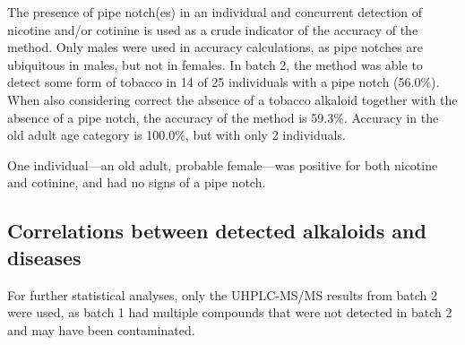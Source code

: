 \documentclass[
  letterpaper,
]{book}
\begin{document}
The presence of pipe notch(es) in an individual and concurrent detection
of nicotine and/or cotinine is used as a crude indicator of the accuracy
of the method. Only males were used in accuracy calculations, as pipe
notches are ubiquitous in males, but not in females. In batch 2, the
method was able to detect some form of tobacco in 14 of 25 individuals
with a pipe notch (56.0\%). When also considering correct the absence of
a tobacco alkaloid together with the absence of a pipe notch, the
accuracy of the method is 59.3\%. Accuracy in the old adult age category
is 100.0\%, but with only 2 individuals.

One individual---an old adult, probable female---was positive for both
nicotine and cotinine, and had no signs of a pipe notch.

\hypertarget{correlations-between-detected-alkaloids-and-diseases}{%
\subsection{Correlations between detected alkaloids and
diseases}\label{correlations-between-detected-alkaloids-and-diseases}}

For further statistical analyses, only the UHPLC-MS/MS results from
batch 2 were used, as batch 1 had multiple compounds that were not
detected in batch 2 and may have been contaminated.
\end{document}
